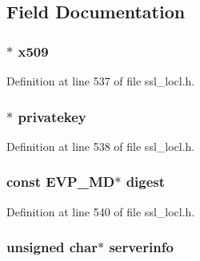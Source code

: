 \subsection{Field Documentation}
\subsubsection[{\texorpdfstring{x509}{x509}}]{$\ast$ x509}\hypertarget{structcert__pkey__st_ae8dd37c61140e5f8d161c160481b53d5}{}\label{structcert__pkey__st_ae8dd37c61140e5f8d161c160481b53d5}


Definition at line 537 of file ssl\+\_\+locl.\+h.

\subsubsection[{\texorpdfstring{privatekey}{privatekey}}]{$\ast$ privatekey}\hypertarget{structcert__pkey__st_abd31aea0dffec1df71b511aed6a61f1b}{}\label{structcert__pkey__st_abd31aea0dffec1df71b511aed6a61f1b}


Definition at line 538 of file ssl\+\_\+locl.\+h.

\subsubsection[{\texorpdfstring{digest}{digest}}]{\setlength{\rightskip}{0pt plus 5cm}const {\bf E\+V\+P\+\_\+\+MD}$\ast$ digest}\hypertarget{structcert__pkey__st_a010537bdae664da8bbf09b191e3dbb0f}{}\label{structcert__pkey__st_a010537bdae664da8bbf09b191e3dbb0f}


Definition at line 540 of file ssl\+\_\+locl.\+h.

\subsubsection[{\texorpdfstring{serverinfo}{serverinfo}}]{\setlength{\rightskip}{0pt plus 5cm}unsigned char$\ast$ serverinfo}\hypertarget{structcert__pkey__st_a163d155a59705bd696559c2ae4fd44fd}{}\label{structcert__pkey__st_a163d155a59705bd696559c2ae4fd44fd}


